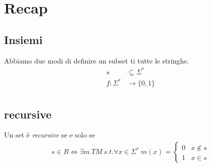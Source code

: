 \documentclass{article}
\begin{document}
\section{Recap}
\subsection{Insiemi}
Abbiamo due modi di definire un subset ti tutte le stringhe.
\begin{align*}
    s &\subseteq \Sigma^* \\
    f:\Sigma^*&\to\{0,1\} \\
\end{align*}

\subsection{recursive}
Un set è \textit{recursive} se e solo se
\begin{align*}
    s\in R \iff \exists m\ TM\ s.t. \forall x\in\Sigma^*\ m(x)=\begin{cases}0&x\not\in s \\ 1 & x\in s\end{cases}
\end{align*}
\end{document}
